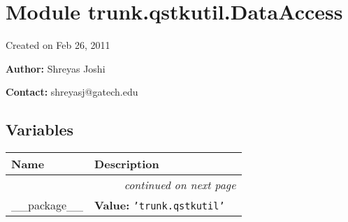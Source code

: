 %
%
%


\section{Module trunk.qstkutil.DataAccess}

    \label{trunk:qstkutil:DataAccess}
Created on Feb 26, 2011

\textbf{Author:} Shreyas Joshi



\textbf{Contact:} shreyasj@gatech.edu





  \subsection{Variables}

    \vspace{-1cm}
\hspace{\varindent}\begin{longtable}{|p{\varnamewidth}|p{\vardescrwidth}|l}
\cline{1-2}
\cline{1-2} \centering \textbf{Name} & \centering \textbf{Description}& \\
\cline{1-2}
\endhead\cline{1-2}\multicolumn{3}{r}{\small\textit{continued on next page}}\\\endfoot\cline{1-2}
\endlastfoot\raggedright \_\-\_\-p\-a\-c\-k\-a\-g\-e\-\_\-\_\- & \raggedright \textbf{Value:} 
{\tt \texttt{'}\texttt{trunk.qstkutil}\texttt{'}}&\\
\cline{1-2}
\end{longtable}



